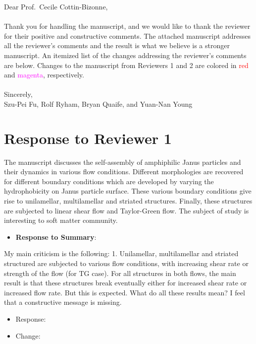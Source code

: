 \documentclass[11pt]{article}
\newcommand{\comment}[1]{{\color{blue} #1}}
\begin{document}
\noindent
Dear Prof.~Cecile Cottin-Bizonne,
\\ \\
\noindent
Thank you for handling the manuscript, and we would like to thank the
reviewer for their positive and constructive comments. The attached
manuscript addresses all the reviewer's comments and the result is what
we believe is a stronger manuscript. An itemized list of the changes
addressing the reviewer's comments are below. Changes to the manuscript
from Reviewers 1 and 2 are colored in \textcolor{red}{red} and 
\textcolor{magenta}{magenta}, respectively. \\ \\
\noindent
Sincerely,
\\
\noindent
Szu-Pei Fu, Rolf Ryham, Bryan Quaife, and Yuan-Nan Young

\section*{Response to Reviewer 1}
\noindent
\comment{The manuscript discusses the self-assembly of amphiphilic Janus
particles and their dynamics in various flow conditions. Different
morphologies are recovered for different boundary conditions which are
developed by varying the hydrophobicity on Janus particle surface.
These various boundary conditions give rise to unilamellar,
multilamellar and striated structures. Finally, these structures are
subjected to linear shear flow and Taylor-Green flow. The subject of
study is interesting to soft matter community.}

\begin{itemize}
  \item {\bf Response to Summary}: 	
  \begin{quotation}
  \end{quotation}
\end{itemize}


\noindent
\comment{My main criticism is
the following: 1. Unilamellar, multilamellar and striated structured are subjected to
various flow conditions, with increasing shear rate or strength of the
flow (for TG case). For all structures in both flows, the main result
is that these structures break eventually either for increased shear
rate or increased flow rate. But this is expected. What do all these
results mean? I feel that a constructive message is missing.}

\begin{itemize}
  \item Response: 
  
  \item Change:
  
\end{itemize}
\end{document}
